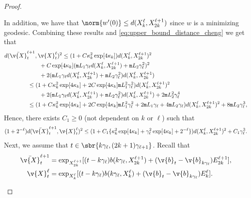 \begin{proof}{}{}
\begin{enumerate}[wide, labelindent=0pt, label=(\alph*)]
		      In addition, we have that $\norm{w'(0)} \leq d(X_k^\ell, X_{2k}^{\ell+1})$ since $w$ is a minimizing geodesic.
		      Combining these results and \eqref{eq:upper_bound_distance_cheng} we get that \begin{align} &d(\bar{\v{X}}_{t}^{\ell+1}, \v{X}_{t}^\ell)^2 \leq (1 +C \kappa_k^2 \exp[4 \kappa_k]) d(X_k^\ell,X_{2k}^{\ell+1})^2 \\ & \qquad \qquad \qquad + C \exp[4 \kappa_k] (\mathtt{m}{L}_1 \gamma_\ell d(X_k^\ell, X_{2k}^{\ell+1}) + \mathtt{m}{L}_2 \gamma_\ell^2)^2 \\ & \qquad \qquad \qquad + 2 (\mathtt{m}{L}_1 \gamma_\ell d(X_k^\ell, X_{2k}^{\ell+1}) + \mathtt{m}{L}_2 \gamma_\ell^2)d(X_k^\ell, X_{2k}^{\ell+1}) \\ & \qquad \qquad \leq (1 +C \kappa_k^2 \exp[4 \kappa_k] + 2C \exp[4 \kappa_k] \mathtt{m}{L}_1^2 \gamma_\ell^2) d(X_k^\ell,X_{2k}^{\ell+1})^2 \\ & \qquad \qquad \qquad + 2 (\mathtt{m}{L}_1 \gamma_\ell d(X_k^\ell, X_{2k}^{\ell+1}) + \mathtt{m}{L}_2 \gamma_\ell^2)d(X_k^\ell, X_{2k}^{\ell+1}) + 2 \mathtt{m}{L}_2^2 \gamma_\ell^4 \\ & \qquad \qquad \leq (1 +C \kappa_k^2 \exp[4 \kappa_k] + 2C \exp[4 \kappa_k] \mathtt{m}{L}_1^2 \gamma_\ell^2 + 2 \mathtt{m}{L}_1 \gamma_\ell + 4 \mathtt{m}{L}_2 \gamma_\ell) d(X_k^\ell,X_{2k}^{\ell+1})^2 + 8 \mathtt{m}{L}_2 \gamma_\ell^3 , \end{align} Hence, there exists $C_1 \geq 0$ (not dependent on $k$ or $\ell$) such that \begin{equation} \label{eq:case_numeroooo_unoooo} (1 + 2^{-\ell}) d(\bar{\v{X}}_{t}^{\ell+1}, \v{X}_{t}^\ell)^2 \leq (1 +C_1\{ \kappa_k^2 \exp[4 \kappa_k] + \gamma_\ell^2 \exp[4\kappa_k] + 2^{-\ell}\}) d(X_k^\ell,X_{2k}^{\ell+1})^2 + C_1 \gamma_\ell^3 .
		      \end{equation}
		      Next, we assume that $t \in \sbr{k \gamma_\ell, (2k+1) \gamma_{\ell+1}}$.
		      Recall that \begin{align} \bar{\v{X}}_{t}^{\ell+1} & = \exp_{X_{2k}^{\ell+1}}[(t - k\gamma_{\ell}) b( k \gamma_{\ell}, X_{2k}^{\ell+1}) + (\v{b}_{t} - \v{b}_{k \gamma_\ell}) E_{2k}^{\ell+1} ] , \\ \v{X}_{t}^\ell &= \exp_{X_k^\ell}[( t - k\gamma_\ell) b(k \gamma_\ell, X_k^\ell) + (\v{b}_{t} - \v{b}_{k \gamma_\ell}) E_{k}^{\ell} ] .
		      \end{align}

\end{enumerate}
\end{proof}
